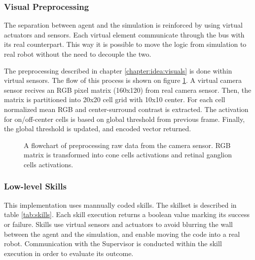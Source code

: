 \subsubsection*{Visual Preprocessing}
The separation between agent and the simulation is reinforced by using virtual actuators and sensors. Each virtual element communicate through the bus with its real counterpart. This way it is possible to move the logic from simulation to real robot without the need to decouple the two.

The preprocessing described in chapter \ref{chapter:idea:visuals} is done within virtual sensors. The flow of this process is shown on figure \ref{fig:flow_preprocess}. A virtual camera sensor recives an RGB pixel matrix (160x120) from real camera sensor. Then, the matrix is partitioned into 20x20 cell grid with 10x10 center. For each cell normalized mean RGB and center-surround contrast is extracted. The activation for on/off-center cells is based on global threshold from previous frame. Finally, the global threshold  is updated, and encoded vector returned. 

\begin{figure}[htbp]
    \centering
    {
        
    }
    \caption{A flowchart of preprocessing raw data from the camera sensor. RGB matrix is transformed into cone cells activations and retinal ganglion cells activations.} 
    \label{fig:flow_preprocess}
\end{figure}

\subsubsection*{Low-level Skills}
This implementation uses mannually coded skills. The skillset is described in table \ref{tab:skills}. Each skill execution returns a boolean value marking its success or failure. Skills use virtual sensors and actuators to avoid blurring the wall between the agent and the simulation, and enable moving the code into a real robot. Communication with the Supervisor is conducted within the skill execution in order to evaluate its outcome.

